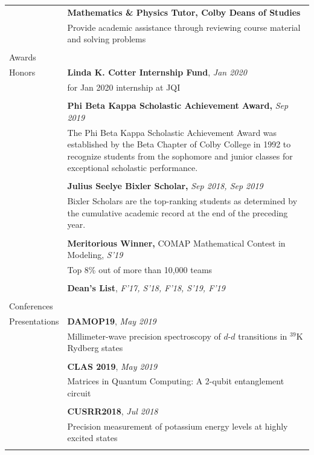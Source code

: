 \documentclass[10pt]{article}
\begin{document}
\begin{longtable}{ l m{13.5cm}   }
     					& \textbf{Mathematics \& Physics Tutor, Colby Deans of Studies} \\
     					& Provide academic assistance through reviewing course material and solving problems \\
     					& \\
     					 
     					 
     					 
  \large{Awards}    	& \\
  \large{Honors}		& \textbf{Linda K. Cotter Internship Fund}, \textit{Jan 2020}\\
  		 				& for Jan 2020 internship at JQI\\
  						&\\
						& \textbf{Phi Beta Kappa Scholastic Achievement Award,} \textit{Sep 2019}\\
  						& The Phi Beta Kappa Scholastic Achievement Award was established by the Beta Chapter of Colby College in 1992 to recognize students from the sophomore and junior classes for exceptional scholastic performance.\\
  						&\\
     				 	& \textbf{Julius Seelye Bixler Scholar,} \textit{Sep 2018, Sep 2019}\\
     				 	& Bixler Scholars are the top-ranking students as determined by the cumulative academic record at the end of the preceding year.\\
     				 	&\\
     				 	& \textbf{Meritorious Winner,}  COMAP Mathematical Contest in Modeling, \textit{S'19}\\
     				 	& Top 8\% out of more than 10,000 teams\\
     				 	&\\
     				 	& \textbf{Dean’s List}, \textit{F'17, S'18, F'18, S'19, F'19}\\
     				 	&\\
     				 	 
  \large{Conferences}   & \\
  \large{Presentations}	& \textbf{DAMOP19}, \textit{May 2019} \\
  						& Millimeter-wave precision spectroscopy of $d$-$d$ transitions in $^{\text{39}}$K Rydberg states\\
  						& \\
  						& \textbf{CLAS 2019}, \textit{May 2019}\\
  						& Matrices in Quantum Computing: A 2-qubit entanglement circuit\\
  						&\\
  						& \textbf{CUSRR2018}, \textit{Jul 2018}\\
  						& Precision measurement of potassium energy levels at highly excited states\\
  	 					& \\ 
 


\end{longtable}
\end{document}
